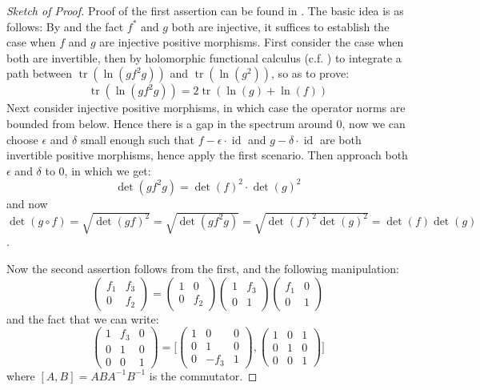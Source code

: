 \documentclass[11pt]{report}
\theoremstyle{definition}
\theoremstyle{plain}
\DeclareMathOperator{\tr}{tr}
\DeclareMathOperator{\id}{id}
\begin{document}
\begin{proof}[Sketch of Proof]
	Proof of the first assertion can be found in \cite[Theorem~3.14]{luck2013}. The basic idea is as follows: By  and the fact $f^*$ and $g$ both are injective, it suffices to establish the case when $f$ and $g$ are injective positive morphisms. First consider the case when both are invertible, then by holomorphic functional calculus (c.f. \cite[Lemma~3.18]{luck2013}) to integrate a path between $\tr(\ln(gf^2g))$ and $\tr(\ln(g^2))$, so as to prove:
	\begin{equation*}
	\tr(\ln(gf^2g))=2\tr(\ln(g)+\ln(f))
	\end{equation*}
	Next consider injective positive morphisms, in which case the operator norms are bounded from below. Hence there is a gap in the spectrum around $0$, now we can choose $\epsilon$ and $\delta$ small enough such that $f-\epsilon\cdot \id$ and $g-\delta\cdot \id$ are both invertible positive morphisms, hence apply the first scenario. Then approach both $\epsilon$ and $\delta$ to $0$, in which we get:
	\begin{equation*}
	\det(gf^2g)=\det(f)^2\cdot \det(g)^2
	\end{equation*}
	and now $\det(g\circ f)=\sqrt{\det(gf)^2}=\sqrt{\det(gf^2g)}=\sqrt{\det(f)^2\det(g)^2}=\det(f)\det(g)$. 
	\par Now the second assertion follows from the first, and the following manipulation:
\begin{equation*}
\begin{pmatrix}
f_1 &f_3\\0 &f_2
\end{pmatrix}=\begin{pmatrix}
1 &0\\ 0& f_2
\end{pmatrix}\begin{pmatrix}
1 &f_3\\ 0& 1
\end{pmatrix}\begin{pmatrix}
f_1 &0\\ 0 &1
\end{pmatrix}
\end{equation*}
 and the fact that we can write:
 \begin{equation*}
 \begin{pmatrix}
 1 &f_3 &0\\ 0 &1 & 0\\ 0 &0 & 1
 \end{pmatrix}=\Bigg[\begin{pmatrix}
 1 &0 &0\\ 0 &1 &0\\ 0 &-f_3 &1
 \end{pmatrix}, \begin{pmatrix}
 1 &0 &1\\ 0&1 &0\\ 0 &0 &1
 \end{pmatrix}\Bigg]
 \end{equation*}
 where $[A, B]=ABA^{-1}B^{-1}$ is the commutator.
\end{proof}
\end{document}

